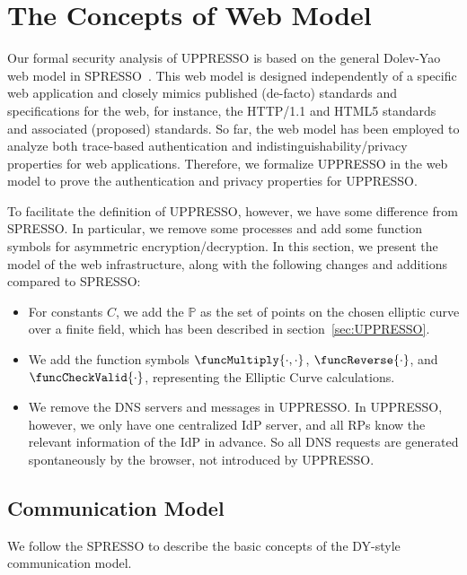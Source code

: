 \section{The Concepts of Web Model}
Our formal security analysis of UPPRESSO is based on the general Dolev-Yao web model in SPRESSO~\cite{SPRESSO}. 
This web model is designed independently of a specific web application and closely mimics published (de-facto) standards and specifications for the web, for instance, the HTTP/1.1 and HTML5 standards and associated (proposed) standards. 
So far, the web model has been employed to analyze both trace-based authentication and indistinguishability/privacy properties for web applications.
Therefore, we formalize UPPRESSO in the web model to prove the authentication and privacy properties for UPPRESSO.

To facilitate the definition of UPPRESSO, however, we have some difference from SPRESSO. 
In particular, we remove some processes and add some function symbols for asymmetric encryption/decryption.
In this section, we present the model of the web infrastructure, along with the following changes and additions compared to SPRESSO:
\begin{itemize}
\item For constants $C$, we add the $\mathbb{P}$ as the set of points on the chosen elliptic curve over a finite field, which has been described in section~\ref{sec:UPPRESSO}.
\item We add the function symbols $\funcMultiply{\cdot, \cdot}$, $\funcReverse{\cdot}$, and $\funcCheckValid{\cdot}$, representing the Elliptic Curve calculations.
\item We remove the DNS servers and messages in UPPRESSO. In UPPRESSO, however, we only have one centralized IdP server, and all RPs know the relevant information of the IdP in advance.
So all DNS requests are generated spontaneously by the browser, not introduced by UPPRESSO.
\end{itemize}

\subsection{Communication Model}
We follow the SPRESSO to describe the basic concepts of the DY-style communication model.

